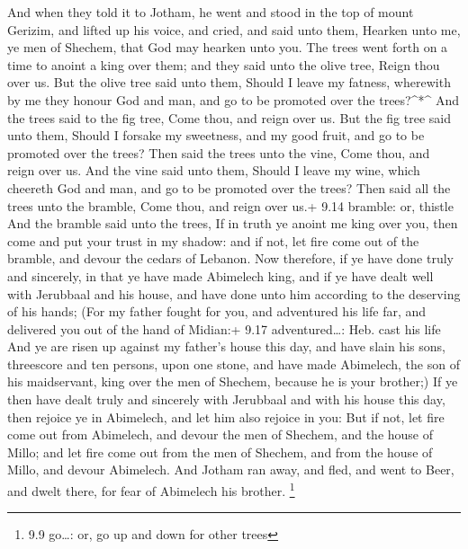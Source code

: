  And when they told it to Jotham, he went and stood in the
top of mount Gerizim, and lifted up his voice, and cried, and said unto
them, Hearken unto me, ye men of Shechem, that God may hearken unto you.
 The trees went forth on a time to anoint a king over them;
and they said unto the olive tree, Reign thou over us.  But
the olive tree said unto them, Should I leave my fatness, wherewith by
me they honour God and man, and go to be promoted over the
trees?\^{}*\^{}  And the trees said to the fig tree, Come
thou, and reign over us.  But the fig tree said unto them,
Should I forsake my sweetness, and my good fruit, and go to be promoted
over the trees?  Then said the trees unto the vine, Come
thou, and reign over us.  And the vine said unto them,
Should I leave my wine, which cheereth God and man, and go to be
promoted over the trees?  Then said all the trees unto the
bramble, Come thou, and reign over us.+ 9.14 bramble: or, thistle
 And the bramble said unto the trees, If in truth ye anoint
me king over you, then come and put your trust in my shadow: and if not,
let fire come out of the bramble, and devour the cedars of Lebanon.
 Now therefore, if ye have done truly and sincerely, in
that ye have made Abimelech king, and if ye have dealt well with
Jerubbaal and his house, and have done unto him according to the
deserving of his hands;  (For my father fought for you, and
adventured his life far, and delivered you out of the hand of Midian:+
9.17 adventured\ldots: Heb. cast his life  And ye are risen
up against my father's house this day, and have slain his sons,
threescore and ten persons, upon one stone, and have made Abimelech, the
son of his maidservant, king over the men of Shechem, because he is your
brother;)  If ye then have dealt truly and sincerely with
Jerubbaal and with his house this day, then rejoice ye in Abimelech, and
let him also rejoice in you:  But if not, let fire come out
from Abimelech, and devour the men of Shechem, and the house of Millo;
and let fire come out from the men of Shechem, and from the house of
Millo, and devour Abimelech.  And Jotham ran away, and
fled, and went to Beer, and dwelt there, for fear of Abimelech his
brother. \footnote{9.9 go\ldots: or, go up and down for other trees}

